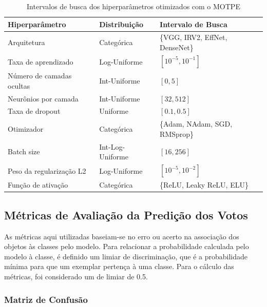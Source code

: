 \begin{table}[!ht]
  \centering
  \caption{Intervalos de busca dos hiperparâmetros otimizados com o MOTPE}
  \label{tab:hps}
  \begin{tabular}{lll}
    \toprule
    Hiperparâmetro            & Distribuição     & Intervalo de Busca              \\
    \midrule
    Arquitetura               & Categórica       & \{VGG, IRV2, EffNet, DenseNet\} \\
    Taxa de aprendizado       & Log-Uniforme     & $[10^{-5}, 10^{-1}]$            \\
    Número de camadas ocultas & Int-Uniforme     & $[0, 5]$                        \\
    Neurônios por camada      & Int-Uniforme     & $[32, 512]$                     \\
    Taxa de dropout           & Uniforme         & $[0.1, 0.5]$                    \\
    Otimizador                & Categórica       & \{Adam, NAdam, SGD, RMSprop\}   \\
    Batch size                & Int-Log-Uniforme & $[16, 256]$                     \\
    Peso da regularização L2  & Log-Uniforme     & $[10^{-5}, 10^{-2}]$            \\
    Função de ativação        & Categórica       & \{ReLU, Leaky ReLU, ELU\}       \\
    \bottomrule
  \end{tabular}
\end{table}




\subsection{Métricas de Avaliação da Predição dos Votos}
\label{sec:metricas-votos}

As métricas aqui utilizadas baseiam-se no erro ou acerto na associação dos objetos às classes pelo modelo. Para relacionar a probabilidade calculada pelo modelo à classe, é definido um limiar de discriminação, que é a probabilidade mínima para que um exemplar pertença à uma classe. Para o cálculo das métricas, foi considerado um de limiar de 0.5.

\subsubsection{Matriz de Confusão}
\label{sec:metricas-confusao}

